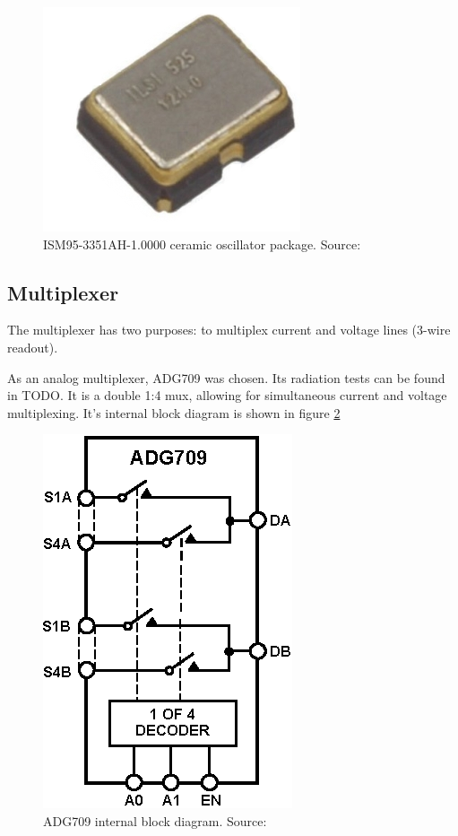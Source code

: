         \begin{figure}[H]
            \centering
            \includegraphics[width=0.5\paperwidth]{img/06/ISM95.png}
            \caption{ISM95-3351AH-1.0000 ceramic oscillator package. Source: \cite{ISM95_series_datasheet}}
            \label{ISM95-3351AH-1.0000}
        \end{figure}


    \subsection{Multiplexer}
        The multiplexer has two purposes: to multiplex current and voltage lines (3-wire readout).

        As an analog multiplexer, ADG709 was chosen. Its radiation tests can be found in TODO. It is a double 1:4 mux, allowing for simultaneous current and voltage multiplexing. It's internal block diagram is shown in figure \ref{ADG709_block}

        \begin{figure}[H]
            \centering
            \includegraphics[width=0.3\paperwidth]{img/06/ADG709.eps}
            \caption{ADG709 internal block diagram. Source: \cite{ADG709_datasheet}}
            \label{ADG709_block}
        \end{figure}

